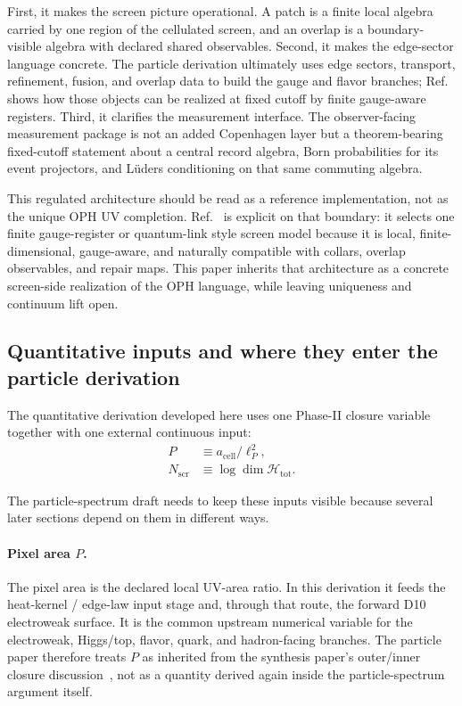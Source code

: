 \documentclass[11pt]{article}
\begin{document}
First, it makes the screen picture operational. A patch is a finite local
algebra carried by one region of the cellulated screen, and an overlap is a
boundary-visible algebra with declared shared observables. Second, it makes the edge-sector
language concrete. The particle derivation ultimately uses edge sectors, transport, refinement,
fusion, and overlap data to build the gauge and flavor branches; Ref.~\cite{ophmicrophysics} shows
how those objects can be realized at fixed cutoff by finite gauge-aware registers.
Third, it clarifies the measurement interface. The observer-facing measurement package is not an
added Copenhagen layer but a theorem-bearing fixed-cutoff statement about a central record
algebra, Born probabilities for its event projectors, and L\"uders conditioning on that same
commuting algebra.

This regulated architecture should be read as a reference implementation, not as the unique OPH
UV completion. Ref.~\cite{ophmicrophysics} is explicit on that boundary: it selects one finite
gauge-register or quantum-link style screen model because it is local, finite-dimensional,
gauge-aware, and naturally compatible with collars, overlap observables, and repair maps. This
paper inherits that architecture as a concrete screen-side realization of the OPH
language, while leaving uniqueness and continuum lift open.

\subsection{Quantitative inputs and where they enter the particle derivation}

The quantitative derivation developed here uses one Phase-II closure variable together with one
external continuous input:
\begin{align}
P &\equiv a_{\mathrm{cell}}/\ell_P^2,\\
N_{\mathrm{scr}} &\equiv \log \dim \mathcal H_{\mathrm{tot}}.
\end{align}

The particle-spectrum draft needs to keep these inputs visible because several later sections
depend on them in different ways.

\paragraph{Pixel area \(P\).}
The pixel area is the declared local UV-area ratio. In this derivation it feeds the heat-kernel /
edge-law input stage and, through that route, the forward D10 electroweak surface. It is the
common upstream numerical variable for the electroweak, Higgs/top, flavor, quark, and
hadron-facing branches. The particle paper therefore treats \(P\) as inherited from the synthesis
paper's outer/inner closure discussion~\cite{ophsynthesis}, not as a quantity derived again inside
the particle-spectrum argument itself.
\end{document}
